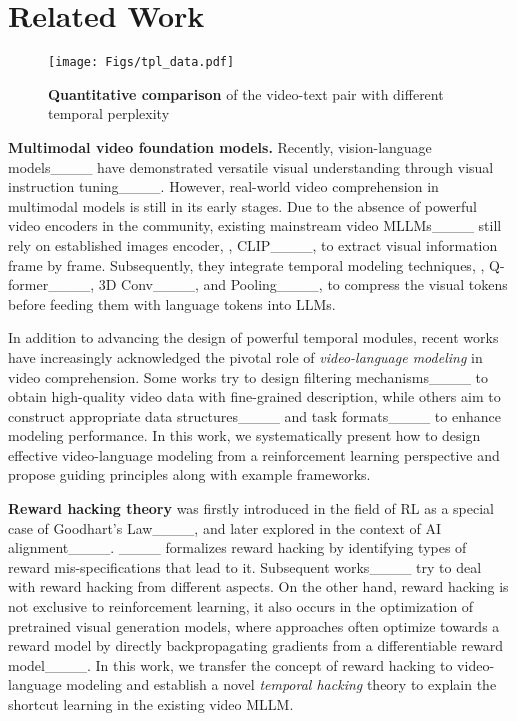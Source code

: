 \section{Related Work}
\label{related_work}

\begin{figure*}[t]
\centering
\texttt{[image: Figs/tpl\_data.pdf]}
\vspace{-8mm}
\caption{\textbf{Quantitative comparison} of the video-text pair with different temporal perplexity}
\label{fig:tpl_data}
\vspace{-6mm}
\end{figure*}

\textbf{Multimodal video foundation models.} Recently, vision-language models____ have demonstrated versatile visual understanding through visual instruction tuning____. However, real-world video comprehension in multimodal models is still in its early stages. Due to the absence of powerful video encoders in the community, existing mainstream video MLLMs____ still rely on established images encoder, \ie, CLIP____, to extract visual information frame by frame. Subsequently, they integrate temporal modeling techniques, \eg, Q-former____, 3D Conv____, and Pooling____, to compress the visual tokens before feeding them with language tokens into LLMs. 

In addition to advancing the design of powerful temporal modules, recent works have increasingly acknowledged the pivotal role of \textit{video-language modeling} in video comprehension. Some works try to design filtering mechanisms____ to obtain high-quality video data with fine-grained description, while others aim to construct appropriate data structures____ and task formats____ to enhance modeling performance. In this work, we systematically present how to design effective video-language modeling from a reinforcement learning perspective and propose guiding principles along with example frameworks.

\textbf{Reward hacking theory} was firstly introduced in the field of RL as a special case of Goodhart's Law____, and later explored in the context of AI alignment____. ____ formalizes reward hacking by identifying types of reward mis-specifications that lead to it. Subsequent works____ try to deal with reward hacking from different aspects. On the other hand, reward hacking is not exclusive to reinforcement learning, it also occurs in the optimization of pretrained visual generation models, where approaches often optimize towards a reward model by directly backpropagating gradients from a differentiable reward model____. In this work, we transfer the concept of reward hacking to video-language modeling and establish a novel \textit{temporal hacking} theory to explain the shortcut learning in the existing video MLLM.
